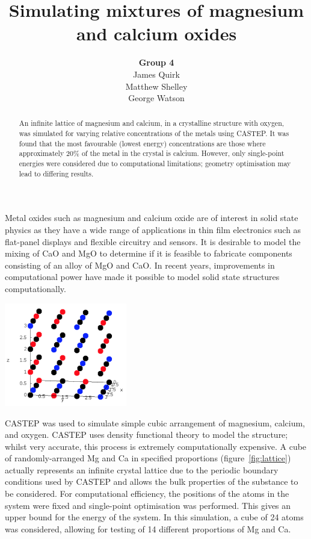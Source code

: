 \documentclass[a4paper,12pt]{article}
\title{Simulating mixtures of magnesium and calcium oxides}
\author{\textbf{Group 4}\\
	James Quirk\\
	Matthew Shelley\\
	George Watson}
\date{}
\begin{document}
\maketitle

\begin{abstract}
    An infinite lattice of magnesium and calcium, in a crystalline structure with oxygen, was simulated for varying relative concentrations of the metals using CASTEP. It was found that the most favourable (lowest energy) concentrations are those where approximately 20\% of the metal in the crystal is calcium. However, only single-point energies were considered due to computational limitations; geometry optimisation may lead to differing results.
\end{abstract}

\begin{multicols}{2}
	
	Metal oxides such as magnesium and calcium oxide are of interest in solid state physics as they have a wide range of applications in thin film electronics such as flat-panel displays and flexible circuitry and sensors.\cite{kim2011lowtemperature} It is desirable to model the mixing of CaO and MgO to determine if it is feasible to fabricate components consisting of an alloy of MgO and CaO. In recent years, improvements in computational power have made it possible to model solid state structures computationally.
	\begin{center}
	    \includegraphics[keepaspectratio=true,width=0.4\textwidth]{lattice}
			\label{fig:lattice} 
	\end{center}
	CASTEP\cite{clark2009first} was used to simulate simple cubic arrangement of magnesium, calcium, and oxygen. CASTEP uses density functional theory to model the structure; whilst very accurate, this process is extremely computationally expensive. A cube of randomly-arranged Mg and Ca in specified proportions (figure~\ref{fig:lattice}) actually represents an infinite crystal lattice due to the periodic boundary conditions used by CASTEP and allows the bulk properties of the substance to be considered. For computational efficiency, the positions of the atoms in the system were fixed and single-point optimisation was performed. This gives an upper bound for the energy of the system. In this simulation, a cube of 24 atoms was considered, allowing for testing of 14 different proportions of Mg and Ca. 
	

\end{multicols}
\end{document}
